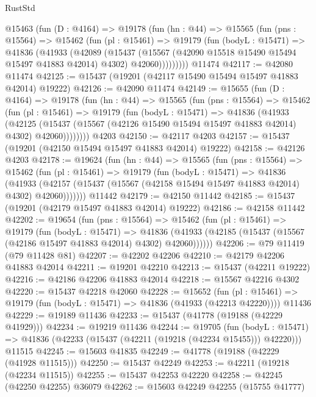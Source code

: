 \begin{lexlean}{RustStd}
\begin{coremodule}
    @15463
      (fun (D : @4164) =>
      @19178
        (fun (hn : @44) =>
        @15565
          (fun (pns : @15564) =>
          @15462
            (fun (pl : @15461) =>
            @19179
              (fun (bodyL : @15471) =>
              @41836
                (@41933
                  (@42089
                    (@15437
                      (@15567 (@42090 @15518 @15490 @15494 @15497 @41883 @42014) @4302)
                      @42060)))))))))
    @11474
@42117 := @42080 @11474
@42125 := @15437 (@19201 (@42117 @15490 @15494 @15497 @41883 @42014) @19222)
@42126 := @42090 @11474
@42149 := @15655
    (fun (D : @4164) =>
    @19178
      (fun (hn : @44) =>
      @15565
        (fun (pns : @15564) =>
        @15462
          (fun (pl : @15461) =>
          @19179
            (fun (bodyL : @15471) =>
            @41836
              (@41933
                (@42125
                  (@15437 (@15567 (@42126 @15490 @15494 @15497 @41883 @42014) @4302) @42060))))))))
    @4203
@42150 := @42117 @4203
@42157 := @15437 (@19201 (@42150 @15494 @15497 @41883 @42014) @19222)
@42158 := @42126 @4203
@42178 := @19624
    (fun (hn : @44) =>
    @15565
      (fun (pns : @15564) =>
      @15462
        (fun (pl : @15461) =>
        @19179
          (fun (bodyL : @15471) =>
          @41836
            (@41933
              (@42157 (@15437 (@15567 (@42158 @15494 @15497 @41883 @42014) @4302) @42060)))))))
    @11442
@42179 := @42150 @11442
@42185 := @15437 (@19201 (@42179 @15497 @41883 @42014) @19222)
@42186 := @42158 @11442
@42202 := @19654
    (fun (pns : @15564) =>
    @15462
      (fun (pl : @15461) =>
      @19179
        (fun (bodyL : @15471) =>
        @41836 (@41933 (@42185 (@15437 (@15567 (@42186 @15497 @41883 @42014) @4302) @42060))))))
@42206 := @79 @11419 (@79 @11428 @81)
@42207 := @42202 @42206
@42210 := @42179 @42206 @41883 @42014
@42211 := @19201 @42210
@42213 := @15437 (@42211 @19222)
@42216 := @42186 @42206 @41883 @42014
@42218 := @15567 @42216 @4302
@42220 := @15437 @42218 @42060
@42228 := @15652
    (fun (pl : @15461) => @19179 (fun (bodyL : @15471) => @41836 (@41933 (@42213 @42220))))
    @11436
@42229 := @19189 @11436
@42233 := @15437 (@41778 (@19188 (@42229 @41929)))
@42234 := @19219 @11436
@42244 := @19705
    (fun (bodyL : @15471) => @41836 (@42233 (@15437 (@42211 (@19218 (@42234 @15455))) @42220)))
    @11515
@42245 := @15603 @41835
@42249 := @41778 (@19188 (@42229 (@41928 @11515)))
@42250 := @15437 @42249
@42253 := @42211 (@19218 (@42234 @11515))
@42255 := @15437 @42253 @42220
@42258 := @42245 (@42250 @42255) @36079
@42262 := @15603 @42249 @42255 (@15755 @41777)

\end{coremodule}
\end{lexlean}
